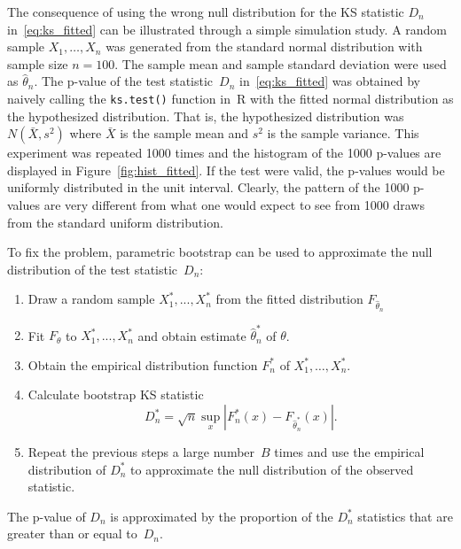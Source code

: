 \documentclass[12pt, letterpaper, titlepage]{article}
\begin{document}
The consequence of using the wrong null distribution for the KS statistic $D_n$
in~\eqref{eq:ks_fitted} can be illustrated through a simple simulation study. A
random sample $X_1, \ldots, X_n$ was generated from the standard normal
distribution with sample size $n = 100$. The sample mean and sample standard
deviation were used as $\hat\theta_n$. The p-value of the test
statistic~$D_n$ in~\eqref{eq:ks_fitted} was obtained by naively calling the
\texttt{ks.test()} function in~R with the fitted normal distribution as the
hypothesized distribution. That is, the hypothesized distribution was
$N(\bar X, s^2)$ where $\bar X$ is the sample mean and $s^2$ is the sample
variance. This experiment was repeated 1000 times and the histogram of the
1000 p-values are displayed in Figure~\ref{fig:hist_fitted}. If the test were
valid, the p-values would be uniformly distributed in the unit
interval. Clearly, the pattern of the 1000 p-values are very different from what
one would expect to see from 1000 draws from the standard uniform
distribution.


To fix the problem, parametric bootstrap can be used to approximate the null
distribution of the test statistic~$D_n$:
\begin{enumerate}
\item
  Draw a random sample $X_1^*,...,X_n^*$ from the fitted distribution
  $F_{\hat\theta_n}$
\item
  Fit $F_\theta$ to $X_1^*,...,X_n^*$ and obtain estimate 
	$\hat\theta_n^*$ of $\theta$.
\item
  Obtain the empirical distribution function $F_n^*$ of
  $X_1^*, \ldots,  X_n^*$.
\item
  Calculate bootstrap KS statistic
  \[
    D_n^* = \sqrt{n} \sup_x | F_n^* (x)- F_{\hat\theta_n^*}(x) |.
  \]
\item
  Repeat the previous steps a large number~$B$ times and use the empirical
  distribution of $D_n^*$ to approximate the null distribution of the observed
  statistic.
\end{enumerate}
The p-value of $D_n$ is approximated by the proportion of the $D_n^*$ 
statistics that are
greater than or equal to~$D_n$.
\end{document}
